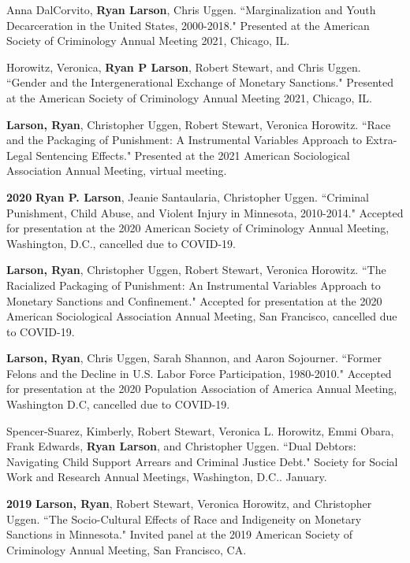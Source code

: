 \documentclass[letterpaper]{article}
\newenvironment{publist}{%
  \begin{list}{}{%
    \setlength{\leftmargin}{0cm}   %
    \setlength{\labelwidth}{2cm}     %
    \setlength{\labelsep}{0.5cm}     %
  }%
}{%
  \end{list}%
}
\begin{document}
\begin{publist}
\item Anna DalCorvito, \textbf{Ryan Larson}, Chris Uggen. ``Marginalization and Youth Decarceration in the United States, 2000-2018." Presented at the American Society of Criminology Annual Meeting 2021, Chicago, IL. 

\item Horowitz, Veronica, \textbf{Ryan P Larson}, Robert Stewart, and Chris Uggen. ``Gender and the Intergenerational Exchange of Monetary Sanctions." Presented at the American Society of Criminology Annual Meeting 2021, Chicago, IL. 

\item \textbf{Larson, Ryan}, Christopher Uggen, Robert Stewart, Veronica Horowitz. ``Race and the Packaging of Punishment: A Instrumental Variables Approach to Extra-Legal Sentencing Effects." Presented at the 2021 American Sociological Association Annual Meeting, virtual meeting. 

\item[\textbf{2020}] \textbf{Ryan P. Larson}, Jeanie Santaularia, Christopher Uggen. ``Criminal Punishment, Child Abuse, and Violent Injury in Minnesota, 2010-2014." Accepted for presentation at the 2020 American Society of Criminology Annual Meeting, Washington, D.C., cancelled due to COVID-19.  

\item \textbf{Larson, Ryan}, Christopher Uggen, Robert Stewart, Veronica Horowitz. ``The Racialized Packaging of Punishment: An Instrumental Variables Approach to Monetary Sanctions and Confinement." Accepted for presentation at the 2020 American Sociological Association Annual Meeting, San Francisco, cancelled due to COVID-19. 

\item \textbf{Larson, Ryan}, Chris Uggen, Sarah Shannon, and Aaron Sojourner. ``Former Felons and the Decline in U.S. Labor Force Participation, 1980-2010." Accepted for presentation at the 2020 Population Association of America Annual Meeting, Washington D.C, cancelled due to COVID-19. 

\item Spencer-Suarez, Kimberly, Robert Stewart, Veronica L. Horowitz, Emmi Obara, Frank Edwards, \textbf{Ryan Larson}, and Christopher Uggen. ``Dual Debtors: Navigating Child Support Arrears and Criminal Justice Debt." Society for Social Work and Research Annual Meetings, Washington, D.C.. January.

\item[\textbf{2019}] \textbf{Larson, Ryan}, Robert Stewart, Veronica Horowitz, and Christopher Uggen. ``The Socio-Cultural Effects of Race and Indigeneity on Monetary Sanctions in Minnesota." Invited panel at the 2019 American Society of Criminology Annual Meeting, San Francisco, CA.


\end{publist}
\end{document}
